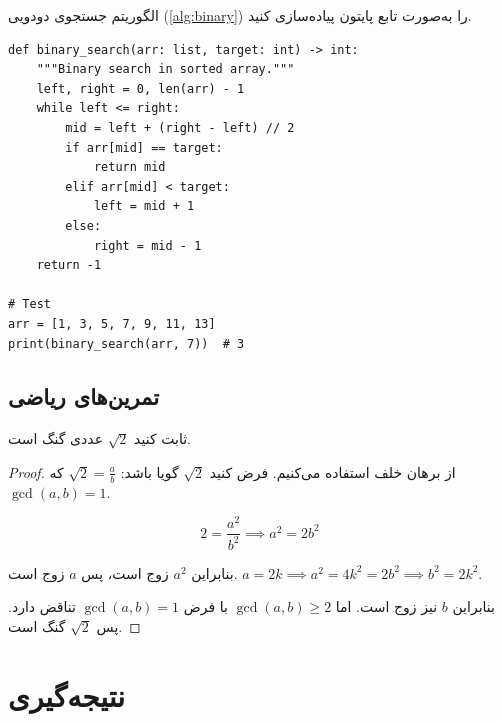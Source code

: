 \documentclass{matinbook}
\begin{document}
\begin{exercise}
    الگوریتم جستجوی دودویی (\cref{alg:binary}) را
    به‌صورت تابع پایتون پیاده‌سازی کنید.
    \label{exc:binary-search}
\end{exercise}

\begin{solution}
    \begin{latin}
\begin{verbatim}
def binary_search(arr: list, target: int) -> int:
    """Binary search in sorted array."""
    left, right = 0, len(arr) - 1
    while left <= right:
        mid = left + (right - left) // 2
        if arr[mid] == target:
            return mid
        elif arr[mid] < target:
            left = mid + 1
        else:
            right = mid - 1
    return -1

# Test
arr = [1, 3, 5, 7, 9, 11, 13]
print(binary_search(arr, 7))  # 3
\end{verbatim}
    \end{latin}
\end{solution}

\section{تمرین‌های ریاضی}
\label{sec:exercises-math}

\begin{exercise}
    ثابت کنید $\sqrt{2}$ عددی گنگ است.
    \label{exc:sqrt2}
\end{exercise}

\begin{proof}
    از برهان خلف استفاده می‌کنیم. فرض کنید $\sqrt{2}$
    گویا باشد: $\sqrt{2} = \frac{a}{b}$ که
    $\gcd(a,b) = 1$.

    \[
    2 = \frac{a^{2}}{b^{2}} \implies a^{2} = 2b^{2}
    \]

    بنابراین $a^{2}$ زوج است، پس $a$ زوج است.
    $a = 2k \implies a^{2} = 4k^{2} = 2b^{2}
    \implies b^{2} = 2k^{2}$.

    بنابراین $b$ نیز زوج است. اما $\gcd(a,b) \geq 2$
    با فرض $\gcd(a,b) = 1$ تناقض دارد.
    پس $\sqrt{2}$ گنگ است.
\end{proof}

\chapter{نتیجه‌گیری}
\label{chap:conclusion}
\end{document}
